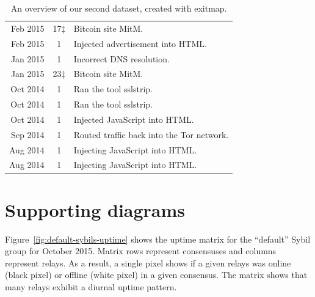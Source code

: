 \begin{table}[t]
\begin{tabular}{r c p{3.9cm}}
Feb 2015 & 17$\ddagger$ & Bitcoin site MitM. \\
Feb 2015 & 1 & Injected advertisement into HTML. \\
Jan 2015 & 1 & Incorrect DNS resolution. \\
Jan 2015 & 23$\ddagger$ & Bitcoin site MitM. \\
Oct 2014 & 1 & Ran the tool sslstrip. \\
Oct 2014 & 1 & Ran the tool sslstrip. \\
Oct 2014 & 1 & Injected JavaScript into HTML. \\
Sep 2014 & 1 & Routed traffic back into the Tor network. \\
Aug 2014 & 1 & Injecting JavaScript into HTML. \\
Aug 2014 & 1 & Injecting JavaScript into HTML. \\
\hline
\end{tabular}
\caption{An overview of our second dataset, created with exitmap.}
\label{tab:exitmap-dataset}
\end{table}

\section{Supporting diagrams}
Figure~\ref{fig:default-sybils-uptime} shows the uptime matrix for the
``default'' Sybil group for October 2015.  Matrix rows represent consensuses and
columns represent relays.  As a result, a single pixel shows if a given relays
was online (black pixel) or offline (white pixel) in a given consensus.  The
matrix shows that many relays exhibit a diurnal uptime pattern.

